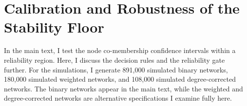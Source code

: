 \documentclass[11pt, letterpaper]{article}
\numberwithin{equation}{section}
\begin{document}
\section{Calibration and Robustness of the Stability Floor}
\label{app:coverage_robust}
In the main text, I test the node co-membership confidence intervals within a reliability region. Here, I discuss the decision rules and the reliability gate further. For the simulations, I generate 891,000 simulated binary networks, 180,000 simulated weighted networks, and 108,000 simulated degree-corrected networks. The binary networks appear in the main text, while the weighted and degree-corrected networks are alternative specifications I examine fully here.
\end{document}
